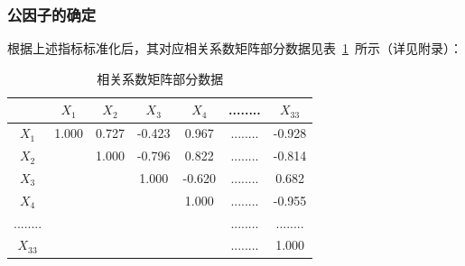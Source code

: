 \documentclass{whutmod}
\begin{document}
	\subsubsection{公因子的确定}
	根据上述指标标准化后，其对应相关系数矩阵部分数据见表~\ref{shuju2}~所示（详见附录）：
	\begin{table}[H]
		 \centering
		\caption{相关系数矩阵部分数据}\label{shuju2}
		\begin{tabular}{ccccccc}
			\toprule[2pt]
			\multicolumn{1}{m{1cm}}{\centering } &
			\multicolumn{1}{m{2cm}}{\centering $X_{1}$} & \multicolumn{1}{m{2cm}}{\centering $X_{2}$} & \multicolumn{1}{m{2cm}}{\centering $X_{3}$}&
			\multicolumn{1}{m{2cm}}{\centering $X_{4}$}&
			\multicolumn{1}{m{1cm}}{\centering ........} &
			\multicolumn{1}{m{2cm}}{\centering $X_{33}$}
			\\
				\midrule[1pt]
			$X_{1}$&1.000	 &  0.727 & -0.423&0.967&........& -0.928\\ 
			$X_{2}$& &  1.000 & -0.796&0.822&........&-0.814\\ 
			$X_{3}$& &   & 1.000&-0.620&........&0.682\\ 
			$X_{4}$& &   & &1.000&........&-0.955\\ 
			........& &   & & &........&........\\ 
			$X_{33}$& &   & & &........&1.000\\
			\bottomrule[2pt]
		\end{tabular}
	\end{table}
	
\end{document}
